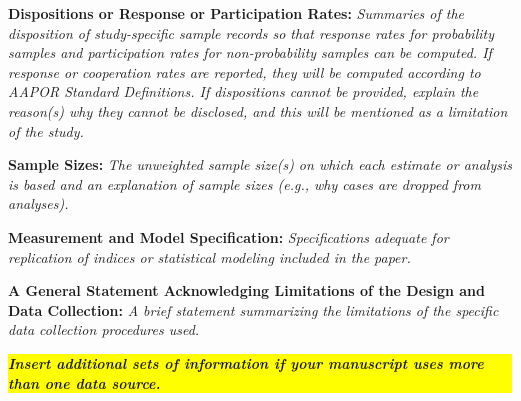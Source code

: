 \documentclass{article}
\begin{document}
\medskip

\textbf{Dispositions or Response or Participation Rates:} \textit{Summaries of the disposition of study-specific sample records so that response rates for probability samples and participation rates for non-probability samples can be computed. If response or cooperation rates are reported, they will be computed according to AAPOR Standard Definitions. If dispositions cannot be provided, explain the reason(s) why they cannot be disclosed, and this will be mentioned as a limitation of the study.}

\medskip

\textbf{Sample Sizes:} \textit{The unweighted sample size(s) on which each estimate or analysis is based and an explanation of sample sizes (e.g., why cases are dropped from analyses).}

\medskip

\textbf{Measurement and Model Specification:} \textit{Specifications adequate for replication of indices or statistical modeling included in the paper.}

\medskip

\textbf{A General Statement Acknowledging Limitations of the Design and Data Collection:} \textit{A brief statement summarizing the limitations of the specific data collection procedures used.}

\medskip






\colorbox{yellow}{\parbox[l]{.92 \textwidth}{
\bfseries \textit{
Insert additional sets of information if your manuscript uses more than one data source.
}}}
\end{document}
